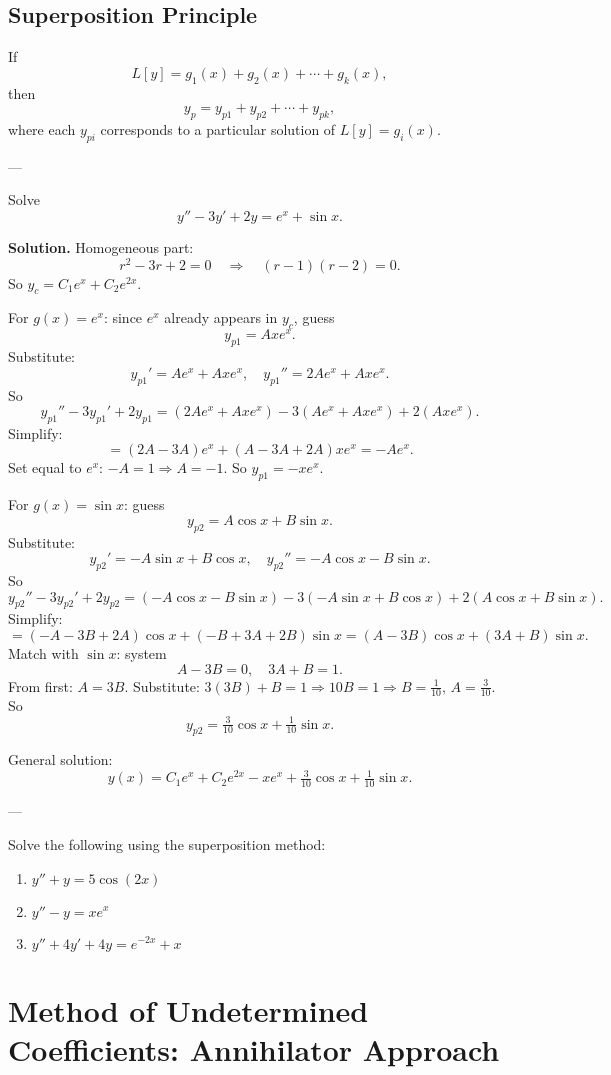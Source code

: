 \subsection*{Superposition Principle}
If
\[
L[y]=g_1(x)+g_2(x)+\cdots+g_k(x),
\]
then
\[
y_p = y_{p1}+y_{p2}+\cdots+y_{pk},
\]
where each $y_{pi}$ corresponds to a particular solution of $L[y]=g_i(x)$.

---

\begin{example}
Solve
\[
y'' - 3y' + 2y = e^x + \sin x.
\]

\textbf{Solution.}  
Homogeneous part:
\[
r^2-3r+2=0 \quad \Rightarrow \quad (r-1)(r-2)=0.
\]
So $y_c=C_1e^x+C_2e^{2x}$.

For $g(x)=e^x$: since $e^x$ already appears in $y_c$, guess
\[
y_{p1}=Ax e^x.
\]
Substitute:
\[
y_{p1}'=Ae^x+Ax e^x, \quad y_{p1}''=2Ae^x+Ax e^x.
\]
So
\[
y_{p1}'' - 3y_{p1}' + 2y_{p1} = (2Ae^x+Ax e^x) -3(Ae^x+Ax e^x)+2(Ax e^x).
\]
Simplify:
\[
= (2A-3A)e^x + (A-3A+2A)x e^x = -Ae^x.
\]
Set equal to $e^x$: $-A=1 \Rightarrow A=-1$.  
So $y_{p1}=-xe^x$.

For $g(x)=\sin x$: guess
\[
y_{p2}=A\cos x + B\sin x.
\]
Substitute:
\[
y_{p2}'=-A\sin x + B\cos x, \quad y_{p2}''=-A\cos x -B\sin x.
\]
So
\[
y_{p2}'' - 3y_{p2}' + 2y_{p2} = (-A\cos x -B\sin x) -3(-A\sin x+B\cos x)+2(A\cos x+B\sin x).
\]
Simplify:
\[
=(-A-3B+2A)\cos x + (-B+3A+2B)\sin x = (A-3B)\cos x+(3A+B)\sin x.
\]
Match with $\sin x$: system
\[
A-3B=0, \quad 3A+B=1.
\]
From first: $A=3B$. Substitute: $3(3B)+B=1 \Rightarrow 10B=1 \Rightarrow B=\tfrac{1}{10}, \, A=\tfrac{3}{10}$.
So
\[
y_{p2}=\tfrac{3}{10}\cos x+\tfrac{1}{10}\sin x.
\]

General solution:
\[
y(x)=C_1e^x+C_2e^{2x}-xe^x+\tfrac{3}{10}\cos x+\tfrac{1}{10}\sin x.
\]
\end{example}

---

\begin{question}
Solve the following using the superposition method:
\begin{enumerate}
    \item $y''+y=5\cos(2x)$
    \item $y''-y=xe^x$
    \item $y''+4y'+4y=e^{-2x}+x$
\end{enumerate}
\end{question}

\newpage
\section{Method of Undetermined Coefficients: Annihilator Approach}

